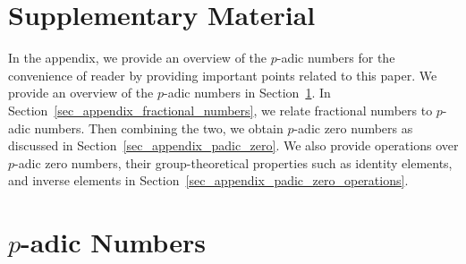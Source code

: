 \documentclass[times,twocolumn,final]{elsarticle}
\begin{document}



\newpage

\appendix

\section*{Supplementary Material}
\label{Sec_Supplementary_Material}

In the appendix, we provide an overview of the $p$-adic numbers for the convenience of reader by providing important points related to this paper. We provide an overview of the $p$-adic numbers in Section~\ref{sec_appendix_padic_numbers}. In Section~\ref{sec_appendix_fractional_numbers}, we relate fractional numbers to $p$-adic numbers. Then combining the two, we obtain $p$-adic zero numbers as discussed in Section~\ref{sec_appendix_padic_zero}. We also provide operations over $p$-adic zero numbers, their group-theoretical properties such as identity elements, and inverse elements in Section~\ref{sec_appendix_padic_zero_operations}.

\section{$p$-adic Numbers}
\label{sec_appendix_padic_numbers}
\end{document}
